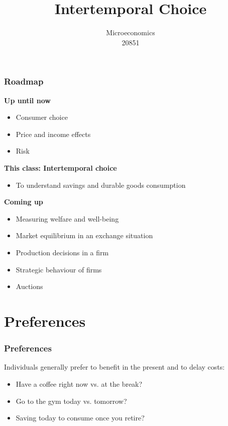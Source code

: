 \documentclass[handout]{beamer}
\title{Intertemporal Choice}
\author{Microeconomics \\ 20851}
\date{}
\newenvironment{iPar}[1]{\textbf{#1} \begin{itemize}}{\end{itemize}}
\newcommand{\mdp}{\medskip \pause}
\begin{document}
\frame{\titlepage}

\section[Outline]{}
\frame{\tableofcontents}

\section{}


\begin{frame}\frametitle{Roadmap}

\begin{iPar}{Up until now}
\item Consumer choice
\item Price and income effects
\item Risk 
\end{iPar}\mdp

\begin{iPar}{This class: Intertemporal choice}
\item To understand savings and durable goods consumption
\end{iPar}\mdp

\begin{iPar}{Coming up}
\item  Measuring welfare and well-being 
\item  Market equilibrium in an exchange situation
\item  Production decisions in a firm
\item Strategic behaviour of firms
\item Auctions
\end{iPar}

\end{frame}

\section{Preferences}

\begin{frame}\frametitle{Preferences}

Individuals generally prefer to benefit in the present and to delay costs:

\begin{itemize}
\item Have a coffee right now vs. at the break?
\item Go to the gym today vs. tomorrow?
\item Saving today to consume once you retire?
\end{itemize}

\end{frame}
\end{document}

